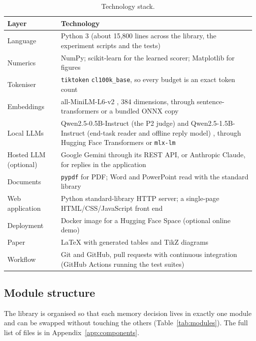 \begin{table}[htbp]
\caption{Technology stack.}
\label{tab:stack}
\centering
\fontsize{10}{12}\selectfont
\begin{tabularx}{\textwidth}{@{}p{3.6cm}X@{}}
\toprule
\textbf{Layer} & \textbf{Technology} \\
\midrule
Language & Python 3 (about 15{,}800 lines across the library, the
experiment scripts and the tests) \\
Numerics & NumPy; scikit-learn \cite{pedregosa2011sklearn} for the learned
scorer; Matplotlib for figures \\
Tokeniser & \texttt{tiktoken} \texttt{cl100k\_base}, so every budget is an
exact token count \\
Embeddings & all-MiniLM-L6-v2 \cite{reimers2019sbert,wang2020minilm}, 384
dimensions, through sentence-transformers or a bundled ONNX copy \\
Local LLMs & Qwen2.5-0.5B-Instruct (the P2 judge) and Qwen2.5-1.5B-Instruct
(end-task reader and offline reply model) \cite{qwen2025}, through Hugging
Face Transformers or \texttt{mlx-lm} \\
Hosted LLM (optional) & Google Gemini \cite{gemini2023} through its REST API,
or Anthropic Claude, for replies in the application \\
Documents & \texttt{pypdf} for PDF; Word and PowerPoint read with the
standard library \\
Web application & Python standard-library HTTP server; a single-page
HTML/CSS/JavaScript front end \\
Deployment & Docker image for a Hugging Face Space (optional online demo) \\
Paper & \LaTeX{} with generated tables and TikZ diagrams \\
Workflow & Git and GitHub, pull requests with continuous integration
(GitHub Actions running the test suites) \\
\bottomrule
\end{tabularx}
\end{table}

\subsection{Module structure}
The library is organised so that each memory decision lives in exactly one
module and can be swapped without touching the others
(Table~\ref{tab:modules}). The full list of files is in
Appendix~\ref{app:components}.

